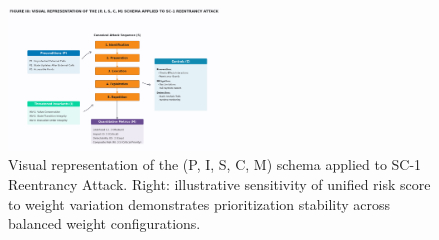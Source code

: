 \begin{figure}[H]
\centering
\includegraphics[width=0.5\textwidth]{../figure/fig3.png}
\caption{Visual representation of the (P, I, S, C, M) schema applied to SC-1 Reentrancy Attack. Right: illustrative sensitivity of unified risk score to weight variation demonstrates prioritization stability across balanced weight configurations.}
\label{fig:schema_blueprint}
\end{figure}
